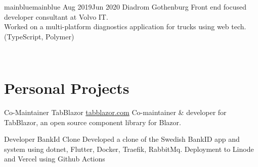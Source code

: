 \documentclass[a4paper]{twentysecondcv} %
\begin{document}
\begin{twenty}
    \vspace{.5em}
    
    \twentyitemtime
    {mainblue}{mainblue}
    {Aug 2019}{Jun 2020}
    {Diadrom}
    {Gothenburg}
    {Front end focused developer consultant at Volvo IT. \\
    Worked on a multi-platform diagnostics application for trucks using web tech. (TypeScript, Polymer)}
    
    \\
    
    
\end{twenty}


\section{Personal Projects}
\begin{twenty}
    \twentyitem
    {Co-Maintainer}
    {TabBlazor}
    {\href{http://tabblazor.com}{tabblazor.com}}
    {Co-maintainer \& developer for TabBlazor, an open source component library for Blazor.}
\end{twenty}

\begin{twenty}
    \twentyitem
    {Developer}
    {BankId Clone}
    {}
    {Developed a clone of the Swedish BankID app and system using dotnet, Flutter, Docker, Traefik, RabbitMq. Deployment to Linode and Vercel using Github Actions}
\end{twenty}

\end{document}

